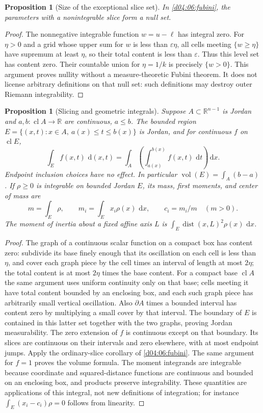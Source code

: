 \documentclass[11pt,oneside,openany]{book}
\newtheorem{proposition}[theorem]{Proposition}
\theoremstyle{definition}
\theoremstyle{remark}
\newcommand{\R}{\mathbb R}
\newcommand{\eps}{\varepsilon}
\newcommand{\dd}{\,\mathrm d}
\DeclareMathOperator{\vol}{vol}
\DeclareMathOperator{\dist}{dist}
\DeclareMathOperator{\cl}{cl}
\newcommand{\family}[1]{}
\begin{document}
\begin{proposition}[Size of the exceptional slice set]\label{d04:06:exceptional-slices}
In \cref{d04:06:fubini}, the parameters with a nonintegrable slice form a null set.
\end{proposition}
\begin{proof}
The nonnegative integrable function $w=u-\ell$ has integral zero. For $\eta>0$ and a grid whose upper sum for $w$ is less than $\eps\eta$, all cells meeting $\{w\geq\eta\}$ have supremum at least $\eta$, so their total content is less than $\eps$. Thus this level set has content zero. Their countable union for $\eta=1/k$ is precisely $\{w>0\}$. This argument proves nullity without a measure-theoretic Fubini theorem. It does not license arbitrary definitions on that null set: such definitions may destroy outer Riemann integrability.
\end{proof}

\family{K04.06.11}\family{K04.06.12}
\begin{proposition}[Slicing and geometric integrals]\label{d04:06:cavalieri}
Suppose $A\subset\R^{n-1}$ is Jordan and $a,b:\cl A\to\R$ are continuous, $a\leq b$. The bounded region
$E=\{(x,t):x\in A,\ a(x)\leq t\leq b(x)\}$ is Jordan, and for continuous $f$ on $\cl E$,
\[
 \int_E f(x,t)\,\dd(x,t)=\int_A\left(\int_{a(x)}^{b(x)}f(x,t)\,\dd t\right)\dd x.
\]
Endpoint inclusion choices have no effect. In particular $\vol(E)=\int_A(b-a)$. If $\rho\geq0$ is integrable on bounded Jordan $E$, its mass, first moments, and center of mass are
\[
 m=\int_E\rho,\qquad m_i=\int_E x_i\rho(x)\,\dd x,\qquad c_i=m_i/m\quad(m>0).
\]
The moment of inertia about a fixed affine axis $L$ is $\int_E\dist(x,L)^2\rho(x)\,\dd x$.
\end{proposition}
\begin{proof}
The graph of a continuous scalar function on a compact box has content zero: subdivide its base finely enough that its oscillation on each cell is less than $\eta$, and cover each graph piece by the cell times an interval of length at most $2\eta$; the total content is at most $2\eta$ times the base content. For a compact base $\cl A$ the same argument uses uniform continuity only on that base; cells meeting it have total content bounded by an enclosing box, and each such graph piece has arbitrarily small vertical oscillation. Also $\partial A$ times a bounded interval has content zero by multiplying a small cover by that interval. The boundary of $E$ is contained in this latter set together with the two graphs, proving Jordan measurability. The zero extension of $f$ is continuous except on that boundary. Its slices are continuous on their intervals and zero elsewhere, with at most endpoint jumps. Apply the ordinary-slice corollary of \cref{d04:06:fubini}. The same argument for $f=1$ proves the volume formula. The moment integrands are integrable because coordinate and squared-distance functions are continuous and bounded on an enclosing box, and products preserve integrability. These quantities are applications of this integral, not new definitions of integration; for instance $\int_E(x_i-c_i)\rho=0$ follows from linearity.
\end{proof}
\end{document}
